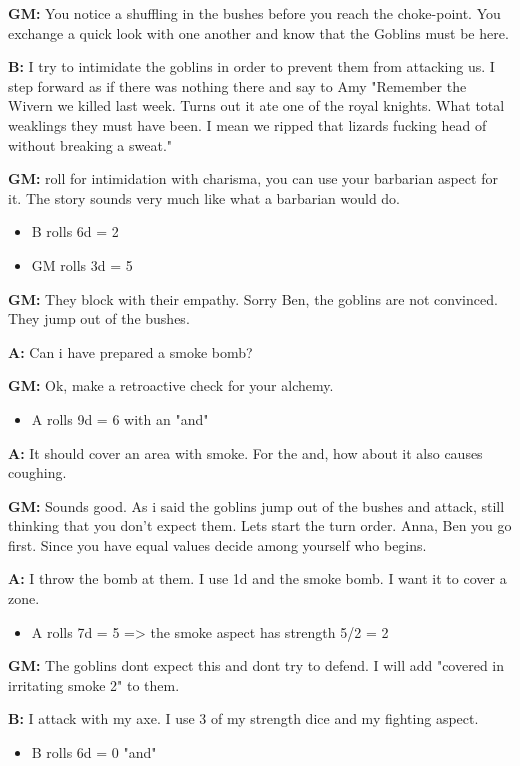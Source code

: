\documentclass[11pt]{article}
\begin{document}
{\textbf{GM:} You notice a shuffling in the bushes before you reach the choke-point. You exchange a quick look with one another and know that the Goblins must be here. 

\textbf{B:} I try to intimidate the goblins in order to prevent them from attacking us. I step forward as if there was nothing there and say to Amy "Remember the Wivern we killed last week. Turns out it ate one of the royal knights. What total weaklings they must have been. I mean we ripped that lizards fucking head of without breaking a sweat."

\textbf{GM:} roll for intimidation with charisma, you can use your barbarian aspect for it. The story sounds very much like what a barbarian would do.
\begin{itemize}
\item B rolls 6d = 2
\item GM rolls 3d = 5
\end{itemize}

\textbf{GM:} They block with their empathy. Sorry Ben, the goblins are not convinced. They jump out of the bushes.

\textbf{A:} Can i have prepared a smoke bomb?

\textbf{GM:} Ok, make a retroactive check for your alchemy.
\begin{itemize}
\item A rolls 9d = 6 with an "and"
\end{itemize}

\textbf{A:} It should cover an area with smoke. For the and, how about it also causes coughing.

\textbf{GM:} Sounds good. As i said the goblins jump out of the bushes and attack, still thinking that you don't expect them. Lets start the turn order. Anna, Ben you go first. Since you have equal values decide among yourself who begins.

\textbf{A:} I throw the bomb at them. I use 1d and the smoke bomb. I want it to cover a zone.
\begin{itemize}
\item A rolls 7d = 5 => the smoke aspect has strength 5/2 = 2
\end{itemize}

\textbf{GM:} The goblins dont expect this and dont try to defend. I will add "covered in irritating smoke 2" to them.

\textbf{B:} I attack with my axe. I use 3 of my strength dice and my fighting aspect.
\begin{itemize}
\item B rolls 6d = 0 "and"
\end{itemize}

}
\end{document}
